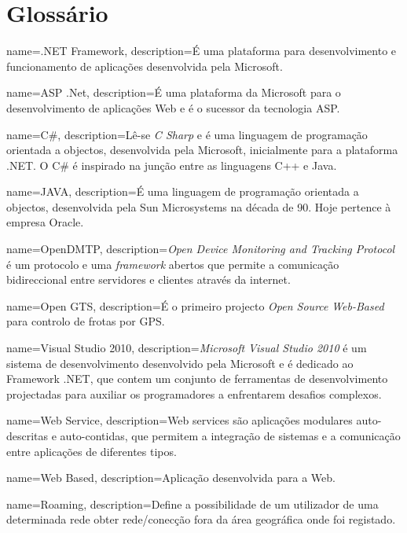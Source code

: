 \chapter*{Glossário}
\label{ch::glossario}
\makeglossaries

{
  name={.NET Framework},
  description={É uma plataforma para desenvolvimento e funcionamento de aplicações desenvolvida pela Microsoft.}
}

{
  name={ASP .Net},
  description={É uma plataforma da Microsoft para o desenvolvimento de aplicações Web e é o sucessor da tecnologia ASP.}
}

{
  name={C\#},
  description={Lê-se \textit{C Sharp} e é uma linguagem de programação orientada a objectos, desenvolvida pela Microsoft, inicialmente para a plataforma .NET. O C\# é inspirado na junção entre as linguagens C++ e Java.}
}


{
  name={JAVA},
  description={É uma linguagem de programação orientada a objectos, desenvolvida pela Sun Microsystems na década de 90. Hoje pertence à empresa Oracle.}
}


{
  name={OpenDMTP},
  description={\textit{Open Device Monitoring and Tracking Protocol} é um protocolo e uma \textit{framework} abertos que permite a comunicação bidireccional entre servidores e clientes através da internet.}
}


{
  name={Open GTS},
  description={É o primeiro projecto \textit{Open Source} \textit{Web-Based} para controlo de frotas por GPS.}
}


{
  name={Visual Studio 2010},
  description={\textit{Microsoft Visual Studio 2010} é um sistema de desenvolvimento desenvolvido pela Microsoft e é dedicado ao Framework .NET, que contem um conjunto de ferramentas de desenvolvimento projectadas para auxiliar os programadores a enfrentarem desafios complexos.}
}


{
	name={Web Service},
	description={Web services são aplicações modulares auto-descritas e auto-contidas, que permitem a integração de sistemas e a comunicação entre aplicações de diferentes tipos.}
}


{
	name={Web Based},
	description={Aplicação desenvolvida para a Web.}
}

{
	name={Roaming},
	description={Define a possibilidade de um utilizador de uma determinada rede obter rede/conecção fora da área geográfica onde foi registado.}
}



